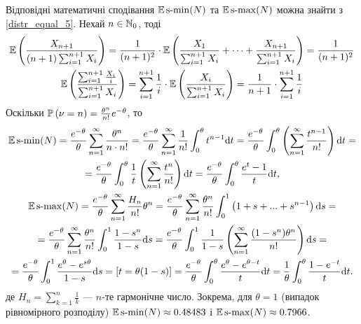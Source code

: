 Відповідні математичні сподівання $\E\smin(N)$ та $\E\smax(N)$ можна знайти з \eqref{distr_equal_5}. 
Нехай $n \in \N_0$, тоді
\begin{gather*}
    \E\left(
        \frac{X_{n+1}}{(n+1)\sum_{i=1}^{n+1} X_i}
    \right) = \frac{1}{(n+1)^2}\cdot \E \left(
        \frac{X_1}{\sum_{i=1}^{n+1} X_i} + \dots + \frac{X_{n+1}}{\sum_{i=1}^{n+1} X_i}
    \right) = \frac{1}{(n+1)^2} \\
    \E\left(
        \frac{\sum_{i=1}^{n+1} \frac{X_i}{i}}{\sum_{i=1}^{n+1} X_i}
    \right) = 
    \sum_{i=1}^{n+1} \frac{1}{i} \cdot \E\left(\frac{X_i}{\sum_{i=1}^{n+1} X_i}\right) = 
    \frac{1}{n+1} \cdot \sum_{i=1}^{n+1} \frac{1}{i}
\end{gather*}
Оскільки $\P{\nu = n} = \frac{\theta^n}{n!}e^{-\theta}$, то
\begin{gather*}
    \E\smin(N) = \frac{e^{-\theta}}{\theta}\sum_{n=1}^{\infty} \frac{\theta^n}{n\cdot n!} =
    \frac{e^{-\theta}}{\theta} \sum_{n=1}^{\infty} \frac{1}{n!} \int_0^{\theta} t^{n-1} \d t = 
    \frac{e^{-\theta}}{\theta} \int_0^{\theta} \left( \sum_{n=1}^{\infty} \frac{t^{n-1}}{n!} \right) \d t = \\ =
    \frac{e^{-\theta}}{\theta} \int_0^{\theta} \frac{1}{t} \left( \sum_{n=1}^{\infty} \frac{t^{n}}{n!} \right) \d t = 
    \frac{e^{-\theta}}{\theta}\int_0^\theta \frac{e^t-1}{t}\d t, \\
    \E\smax(N) = \frac{e^{-\theta}}{\theta}\sum_{n=1}^{\infty} \frac{H_n}{n!} \theta^n = 
    \frac{e^{-\theta}}{\theta}\sum_{n=1}^{\infty} \frac{\theta^n}{n!} \int_0^1 \left(1 + s + ... + s^{n-1}\right) \d s = \\ =
    \frac{e^{-\theta}}{\theta}\sum_{n=1}^{\infty} \frac{\theta^n}{n!} \int_0^1 \frac{1 - s^n}{1 - s} \d s = 
    \frac{e^{-\theta}}{\theta} \int_0^1 \frac{1}{1 - s} \left(
        \sum_{n=1}^{\infty} \frac{(1 - s^n)\theta^n}{n!}
    \right) \d s = \\ =
    \frac{e^{-\theta}}{\theta} \int_0^1 \frac{e^{\theta} - e^{s \theta}}{1 - s} \d s = 
    \left[ t = \theta (1 - s)\right] = 
    \frac{e^{-\theta}}{\theta} \int_0^{\theta} \frac{e^{\theta} - e^{\theta - t}}{t} \d t = 
    \frac{1}{\theta} \int_0^{\theta} \frac{1-e^{-t}}{t}\d t.
\end{gather*}
де $H_n = \sum_{k=1}^n \frac{1}{k}$ --- $n$-те гармонічне число.
Зокрема, для $\theta = 1$ (випадок рівномірного розподілу) 
$\E\smin(N) \approx 0.48483$ і $\E\smax(N) \approx 0.7966$.

